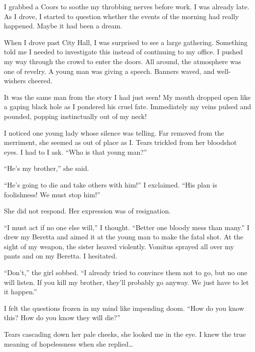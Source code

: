 I grabbed a Coors to soothe my throbbing nerves before work. I was
already late. As I drove, I started to question whether the events
of the morning had really happened. Maybe it had been a
dream.



When I drove past City Hall, I was surprised to see a large
gathering. Something told me I needed to investigate this instead
of continuing to my office. I pushed my way through the crowd to
enter the doors. All around, the atmosphere was one of revelry. A
young man was giving a speech. Banners waved, and well-wishers
cheered.



It was the same man from the story I had just seen! My mouth
dropped open like a gaping black hole as I pondered his cruel fate.
Immediately my veins pulsed and pounded, popping instinctually out
of my neck!



I noticed one young lady whose silence was telling. Far removed
from the merriment, she seemed as out of place as I. Tears trickled
from her bloodshot eyes. I had to I ask. ``Who is that young
man?''



``He's my brother,'' she said.



``He's going to die and take others with him!'' I
exclaimed. ``His plan is foolishness! We must stop
him!''



She did not respond. Her expression was of resignation.



``I must act if no one else will,'' I thought.
``Better one bloody mess than many.'' I drew my Beretta
and aimed it at the young man to make the fatal shot. At the sight
of my weapon, the sister heaved violently. Vomitus sprayed all over
my pants and on my Beretta. I hesitated.



``Don't,'' the girl sobbed. ``I already tried
to convince them not to go, but no one will listen. If you kill my
brother, they'll probably go anyway. We just have to let it
happen.''



I felt the questions frozen in my mind like impending doom.
``How do you know this? How do you know they will
die?''



Tears cascading down her pale cheeks, she looked me in the eye. I
knew the true meaning of hopelessness when she
replied{\ldots}



